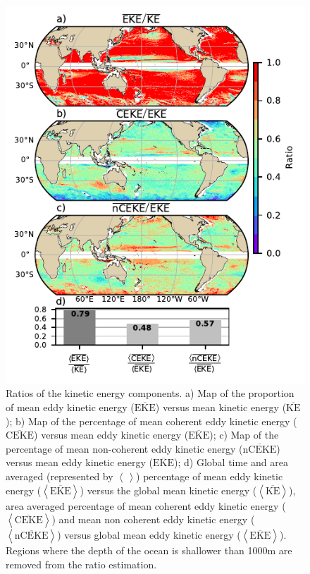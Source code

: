 \documentclass[draft,linenumbers]{agujournal2019}
\newcommand{\MKE}{\overline{\textrm{KE}}}
\newcommand{\MEKE}{\overline{\textrm{EKE}}}
\newcommand{\MCEKE}{\overline{\textrm{CEKE}}}
\newcommand{\MnCEKE}{\overline{\textrm{nCEKE}}}
\begin{document}
	\begin{figure}
	    \centering
	    \includegraphics[width=1\textwidth]{figures/eke_ratio_map_easy.pdf}
	    \caption{Ratios of the kinetic energy components. a) Map of the proportion of mean eddy kinetic energy ($\MEKE$) versus mean kinetic energy ($\MKE$);
		b) Map of the percentage of mean coherent eddy kinetic energy ($\MCEKE$) versus mean eddy kinetic energy ($\MEKE$);
		c) Map of the percentage of mean non-coherent eddy kinetic energy ($\MnCEKE$) versus mean eddy kinetic energy ($\MEKE$);
		d) Global time and area averaged (represented by $\left<\,\right>$) percentage of mean eddy kinetic energy ($\left<\MEKE\right>$) versus the global mean kinetic energy ($\left<\MKE\right>$), area averaged percentage of mean coherent eddy kinetic energy ($\left<\MCEKE\right>$) and mean non coherent eddy kinetic energy ($\left<\MnCEKE\right>$) versus global mean eddy kinetic energy ($\left<\MEKE\right>$). Regions where the depth of the ocean is shallower than 1000m are removed from the ratio estimation.
		}
	    \label{fig:eddy_ratio}
	\end{figure}
\end{document}

